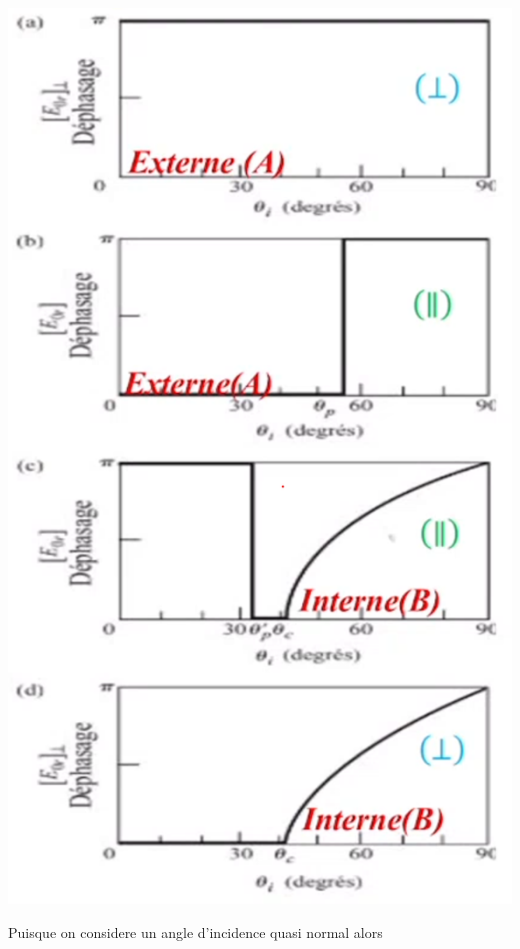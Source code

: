 \documentclass[12pt]{book}
\begin{document}
\begin{itemize}
                    \begin{center}
                        \begin{minipage}{0.3\linewidth}
                            \includegraphics[width=\linewidth]{pic/reflexionvitreuses.png}
                        \end{minipage}
                        \begin{minipage}{0.69\linewidth}
                            Puisque on considere un angle d'incidence quasi normal alors \\

\end{minipage}
\end{center}
\end{itemize}
\end{document}
